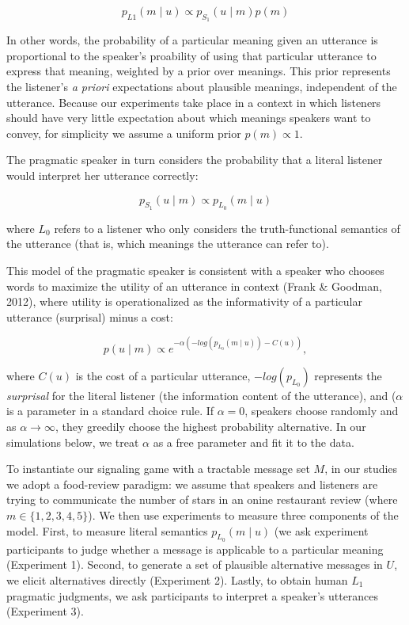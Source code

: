 \documentclass[10pt, letterpaper]{article}
\begin{document}
\[p_{L1}(m \mid u) \propto p_{S_1} (u \mid m) p(m)\]

\noindent In other words, the probability of a particular meaning given
an utterance is proportional to the speaker's proability of using that
particular utterance to express that meaning, weighted by a prior over
meanings. This prior represents the listener's \emph{a priori}
expectations about plausible meanings, independent of the utterance.
Because our experiments take place in a context in which listeners
should have very little expectation about which meanings speakers want
to convey, for simplicity we assume a uniform prior \(p(m) \propto 1\).

The pragmatic speaker in turn considers the probability that a literal
listener would interpret her utterance correctly:

\[ p_{S_1} (u \mid m) \propto p_{L_0} (m \mid u)\]

\noindent where \(L_0\) refers to a listener who only considers the
truth-functional semantics of the utterance (that is, which meanings the
utterance can refer to).

This model of the pragmatic speaker is consistent with a speaker who
chooses words to maximize the utility of an utterance in context (Frank
\& Goodman, 2012), where utility is operationalized as the informativity
of a particular utterance (surprisal) minus a cost:

\[p(u \mid m) \propto e^{-\alpha(-log(p_{L_0}(m \mid u)) - C(u))},\]

\noindent where \(C(u)\) is the cost of a particular utterance,
\(-log(p_{L_0})\) represents the \emph{surprisal} for the literal
listener (the information content of the utterance), and (\(\alpha\) is
a parameter in a standard choice rule. If \(\alpha=0\), speakers choose
randomly and as \(\alpha \rightarrow \infty\), they greedily choose the
highest probability alternative. In our simulations below, we treat
\(\alpha\) as a free parameter and fit it to the data.

To instantiate our signaling game with a tractable message set \(M\), in
our studies we adopt a food-review paradigm: we assume that speakers and
listeners are trying to communicate the number of stars in an onine
restaurant review (where \(m \in \{1, 2, 3, 4, 5\}\)). We then use
experiments to measure three components of the model. First, to measure
literal semantics \({p_{L_0} (m \mid u)}\) (we ask experiment
participants to judge whether a message is applicable to a particular
meaning (Experiment 1). Second, to generate a set of plausible
alternative messages in \(U\), we elicit alternatives directly
(Experiment 2). Lastly, to obtain human \(L_1\) pragmatic judgments, we
ask participants to interpret a speaker's utterances (Experiment 3).
\end{document}

